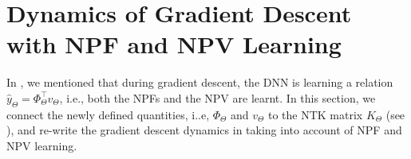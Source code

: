\section{Dynamics of Gradient Descent with NPF and NPV Learning}\label{sec:gatedyna}
In , we mentioned that during gradient descent, the DNN is learning a relation $\hat{y}_{\Theta}=\Phi^\top_{\Theta} v_{\Theta}$, i.e., both the NPFs and the NPV are learnt. In this section, we connect the newly defined quantities, i..e, $\Phi_{\Theta}$ and $v_{\Theta}$ to the NTK matrix $K_{\Theta}$ (see ), and re-write the gradient descent dynamics in  taking into account of NPF and NPV learning.
\begin{comment}
\begin{proposition}
Define $\psiv_{x,\Theta}\stackrel{def}=\left(\ip{\phi_{x,\Theta}, \partial_{\theta} v_{\Theta}},\theta\in\Theta\right)\in\R^{d_{net}}$ and $\psif_{x,\Theta}\stackrel{def}=\left(\ip{\partial_{\theta}\phi_{x,\Theta}, v_{\Theta}},\theta\in\Theta\right)\in\R^{d_{net}}$. It follows that 
$\psi_{x,\Theta}=\psiv_{x,\Theta}+\psif_{x,\Theta}$.
\end{proposition}
\begin{proposition}
In DNNs with ReLU gates, $\psif_{x,\Theta}=0,\forall x\in\R^{d_{in}}, \Theta\in\R^{d_{net}}$.
\end{proposition}
\end{comment}
